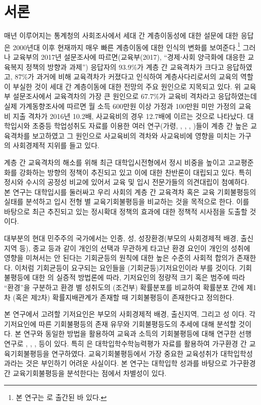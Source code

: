 \section{서론}

매년 이루어지는 통계청의 사회조사에서 세대 간 계층이동성에 대한 설문에 대한 응답은 2000년대 이후 현재까지 매우 빠른 계층이동에 대한 인식의 변화를 보여준다.\footnote{본 연구는 \citet{onj20}로 출간된 바 있다.}
그러나 교육부의 2017년 설문조사에 따르면(교육부(2017), “경제⋅사회 양극화에 대응한 교육복지 정책의 방향과 과제”) 응답자의 93.9\%가 계층 간 교육격차가 크다고 응답하였고, 87\%가 과거에 비해 교육격차가 커졌다고 인식하여 계층사다리로서의 교육의 역할이 부실한 것이 세대 간 계층이동에 대한 전망의 주요 원인으로 지목되고 있다.
위 교육부 설문조사에서 교육격차의 가장 큰 원인으로 67.7\%가 교육비 격차라고 응답하였는데 실제 가계동향조사에 따르면 월 소득 600만원 이상 가정과 100만원 미만 가정의 교육비 지출 격차가 2016년 10.2배, 사교육비의 경우 12.7배에 이르는 것으로 나타났다.
대학입시와 초중등 학업성취도 자료를 이용한 여러 연구(가령, \citet{kim11}, \citet{knl08}, \citet{ketl14}, \citet{ohetl16})들이 계층 간 높은 교육격차를 보고하였고 그 원인으로 사교육비의 격차와 사교육비에 영향을 미치는 가구의 사회경제적 지위를 들고 있다.
  
계층 간 교육격차의 해소를 위해 최근 대학입시전형에서 정시 비중을 높이고 고교평준화를 강화하는 방향의 정책이 추진되고 있고 이에 대한 찬반론이 대립되고 있다.
특히 정시와 수시의 공정성 비교에 있어서 교육 및 입시 전문가들의 의견대립이 첨예하다.
본 연구는 대학입시를 둘러싸고 우리 사회의 계층 간 교육격차 혹은 교육 기회불평등의 실태를 분석하고 입시 전형 별 교육기회불평등을 비교하는 것을 목적으로 한다.
이를 바탕으로 최근 추진되고 있는 정시확대 정책의 효과에 대한 정책적 시사점을 도출할 것이다.
  
대부분의 현대 민주주의 국가에서는 인종, 성, 성장환경(부모의 사회경제적 배경, 출신지역 등), 종교 등과 같이 개인의 선택과 무관하게 타고난 환경 요인이 개인의 성취에 영향을 미쳐서는 안 된다는 기회균등의 원칙에 대한 높은 수준의 사회적 합의가 존재한다.
이처럼 기회균등이 요구되는 요인들을 (기회균등)기저요인이라 부를 것이다.
기회불평등에 대한 \citet{letl08, letl09}의 실증적 방법론에 따라, 기저요인의 정량적 크기 혹은 범주에 따라 “환경”을 구분하고 환경 별 성취도의 (조건부) 확률분포를 비교하여 확률분포 간에 제1차 (혹은 제2차) 확률지배관계가 존재할 때 기회불평등이 존재한다고 정의한다.
   
본 연구에서 고려할 기저요인은 부모의 사회경제적 배경, 출신지역, 그리고 성 이다.
각 기저요인에 따른 기회불평등의 존재 유무와 기회불평등도의 추세에 대해 분석할 것이다.
본 연구와 동일한 방법을 활용하여 교육과 소득의 기회불평등에 대해 연구한 선행연구로 \citet{letl08, letl09}, \citet{ohetl16}, \citet{onj17}, \citet{snj21} 등이 있다.
특히 \citet{ohetl16}은 대학입학수학능력평가 자료를 활용하여 가구환경 간 교육기회불평등을 연구하였다.
교육기회불평등에서 가장 중요한 교육성취가 대학입학성과라는 것은 부인하기 어려운 사실이다.
본 연구는 대학입학 성과를 바탕으로 가구환경 간 교육기회불평등을 분석한다는 점에서 차별성이 있다.
   
